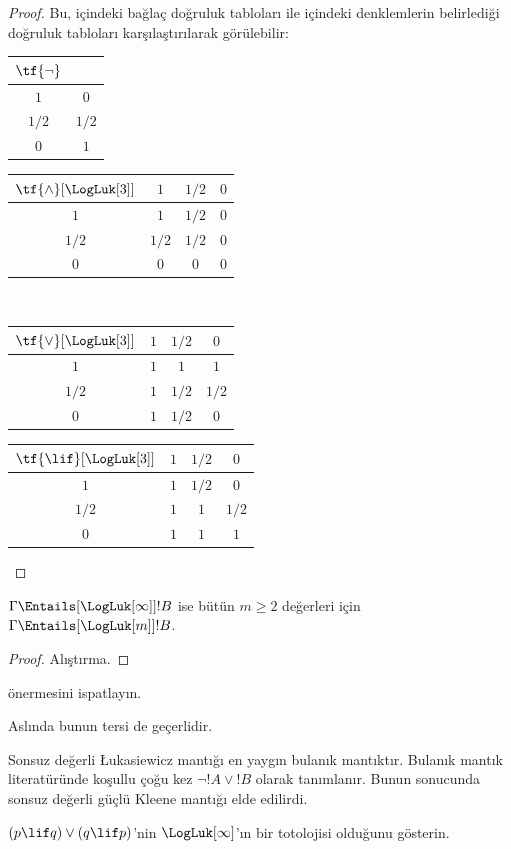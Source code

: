 \begin{proof}
  Bu,  içindeki bağlaç doğruluk tabloları
  ile  içindeki denklemlerin belirlediği doğruluk
  tabloları karşılaştırılarak görülebilir:
  \begin{center}
    \begin{tabular}{c|c} 
      $\tf{\lnot}$ & \\ 
      \hline  
      $1$ & $0$ \\ 
      $1/2$ & $1/2$ \\
      $0$ & $1$ 
    \end{tabular}
    \quad
    \begin{tabular}{c|ccc} 
      $\tf{\land}[\LogLuk[3]]$ & $1$ & $1/2$ & $0$ \\ 
      \hline 
      $1$ & $1$ & $1/2$ & $0$ \\ 
      $1/2$ & $1/2$ & $1/2$ & $0$\\ 
      $0$ & $0$ & $0$ & $0$ 
    \end{tabular}
    \\[2ex]
    \begin{tabular}{c|ccc} 
      $\tf{\lor}[\LogLuk[3]]$ & $1$ & $1/2$ & $0$ \\ 
      \hline 
      $1$ & $1$ & $1$ & $1$ \\ 
      $1/2$ & $1$ & $1/2$ & $1/2$ \\
      $0$ & $1$ & $1/2$ & $0$ 
    \end{tabular}
    \quad
    \begin{tabular}{c|ccc} 
      $\tf{\lif}[\LogLuk[3]]$ & $1$ & $1/2$ & $0$ \\ 
      \hline 
      $1$ & $1$ & $1/2$ & $0$ \\ 
      $1/2$ & $1$ & $1$ & $1/2$  \\ 
      $0$ & $1$ & $1$ & $1$ 
    \end{tabular}
  \end{center} 
\end{proof}

\begin{prop}
  $\Gamma \Entails[\LogLuk[\infty]] !B$ ise bütün $m \ge 2$ değerleri için
  $\Gamma \Entails[\LogLuk[m]] !B$.
\end{prop}

\begin{proof}
  Alıştırma.
\end{proof}

\begin{prob}
   önermesini ispatlayın.
\end{prob}

Aslında bunun tersi de geçerlidir.

Sonsuz değerli \L ukasiewicz mantığı en yaygın bulanık mantıktır. Bulanık
mantık literatüründe koşullu çoğu kez $\lnot !A \lor !B$ olarak tanımlanır.
Bunun sonucunda sonsuz değerli güçlü Kleene mantığı elde edilirdi.

\begin{prob}
  $(p \lif q) \lor (q \lif p)$'nin $\LogLuk[\infty]$'ın bir totolojisi
  olduğunu gösterin.
\end{prob}

